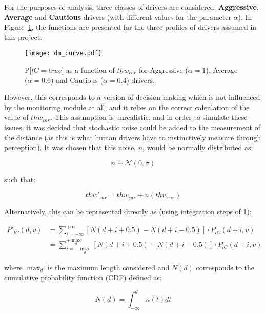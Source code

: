 For the purposes of analysis, three classes of drivers are considered: \textbf{Aggressive}, \textbf{Average} and \textbf{Cautious} drivers (with different values for the parameter $\alpha$). In Figure~\ref{fig:dm_curve}, the functions are presented for the three profiles of drivers assumed in this project.

\begin{figure}[h]
    \centering
    \texttt{[image: dm\_curve.pdf]}
    \caption{$\text{P[}lC = true\text{]}$ as a function of $thw_{car}$ for Aggressive ($\alpha = 1$), Average ($\alpha = 0.6$) and Cautious ($\alpha = 0.4$) drivers.}
    \label{fig:dm_curve}
\end{figure}

However, this corresponds to a version of decision making which is not influenced by the monitoring module at all, and it relies on the correct calculation of the value of $thw_{car}$. This assumption is unrealistic, and in order to simulate these issues, it was decided that stochastic noise could be added to the measurement of the distance (as this is what human drivers have to instinctively measure through perception). It was chosen that this noise, $n$, would be normally distributed as:

\begin{equation}
	n \sim \mathcal{N}(0, \sigma)
\end{equation}

such that:

\begin{equation}
	thw'_{car} = thw_{car} + n(thw_{car})
\end{equation}

Alternatively, this can be represented directly as (using integration steps of 1):

\begin{equation}
\begin{aligned}
	P'_{lC}(d,v) & = \sum_{i = -\infty}^{+\infty} [N(d + i + 0.5) - N(d + i - 0.5)] \cdot P_{lC}(d + i,v) \\
	& = \sum_{i = -\max_d}^{+\max_d} [N(d + i + 0.5) - N(d + i - 0.5)] \cdot P_{lC}(d + i,v)
\end{aligned}
\end{equation}

where $\max_d$ is the maximum length considered and $N(d)$ corresponds to the cumulative probability function (CDF) defined as:

\begin{equation}
	N(d) = \int_{-\infty}^d n(t) dt
\end{equation}

